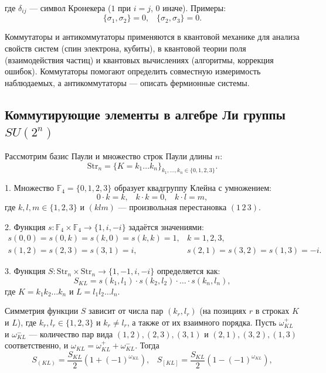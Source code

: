 \documentclass[a4paper]{report}
\begin{document}
\noindent где ${\delta_{ij}}$ — символ Кронекера ($1$ при ${i = j}$, $0$ иначе). Примеры:
$${\{\sigma_1, \sigma_2\} = 0,\;\;\; \{\sigma_2, \sigma_3\} = 0.}$$

Коммутаторы и антикоммутаторы применяются в квантовой механике для анализа свойств систем (спин электрона, кубиты), в квантовой теории поля (взаимодействия частиц) и квантовых вычислениях (алгоритмы, коррекция ошибок). Коммутаторы помогают определить совместную измеримость наблюдаемых, а антикоммутаторы — описать фермионные системы.


\subsection{Коммутирующие элементы в алгебре Ли группы ${SU(2^{n})}$}

Рассмотрим базис Паули и множество строк Паули длины ${n}$:
$${
    \mathrm{Str}_n = \{K = k_1\ldots k_n\}_{k_1,\ldots,k_n \in \{0,1,2,3\}}.
}$$

1. Множество ${\mathbb{F}_4 = \{0,1,2,3\}}$ образует квадгруппу ${\mbox{Клейна}}$ с умножением:
$${
    0 \cdot k = k,\;\;\;
    k \cdot k = 0,\;\;\;
    k \cdot l = m,
}$$
где ${k,l,m \in \{1,2,3\}}$ и ${(klm)}$ — произвольная перестановка ${(1\,2\,3)}$.

2. Функция ${s: \mathbb{F}_4 \times \mathbb{F}_4 \to \{1, i, -i\}}$ задаётся значениями:
$${
    \begin{array}{ll}
        s(0,0) = s(0,k) = s(k,0) = s(k,k) = 1, & k=1,2,3, \\
        s(1,2) = s(2,3) = s(3,1) = i, & s(2,1) = s(3,2) = s(1,3) = -i.
    \end{array}
}$$

3. Функция ${S: \mathrm{Str}_n \times \mathrm{Str}_n \to \{1, -1, i, -i\}}$ определяется как:
$${
    S_{KL} = s(k_1, l_1) \cdot s(k_2, l_2) \cdot \ldots \cdot s(k_n, l_n),
}$$
где ${K = k_1k_2\ldots k_n}$ и ${L = l_1l_2\ldots l_n}$.

Симметрия функции ${S}$ зависит от числа пар ${(k_r, l_r)}$ (на позициях ${r}$ в строках ${K}$ и ${L}$), где ${k_r, l_r \in \{1,2,3\}}$ и ${k_r \neq l_r}$, а также от их взаимного порядка. Пусть ${\omega^+_{KL}}$ и ${\omega^-_{KL}}$ — количество пар вида ${(1,2),(2,3),(3,1)}$ и ${(2,1),(3,2),(1,3)}$ соответственно, и ${\omega_{KL} = \omega^+_{KL} + \omega^-_{KL}}$. Тогда
\begin{equation}\label{eq5}
    S_{(KL)} = \frac{S_{KL}}{2}\left(1 + (-1)^{\omega_{KL}}\right),\;\;\;
    S_{[KL]} = \frac{S_{KL}}{2}\left(1 - (-1)^{\omega_{KL}}\right),
\end{equation}
\end{document}
